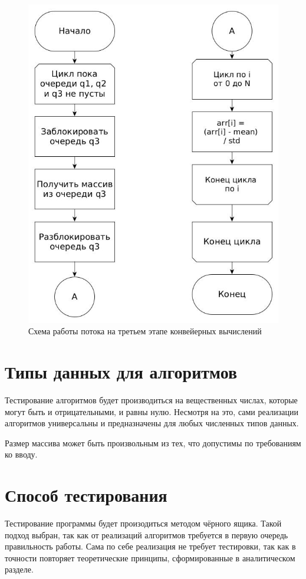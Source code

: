 \FloatBarrier
\begin{figure}[hp]
	\label{classic}
	\begin{center}
		\includegraphics[width=\linewidth]{graph/ex3.jpg}
	\end{center}
	\caption{Схема работы потока на третьем этапе конвейерных вычислений}
\end{figure}
\FloatBarrier


\section{Типы данных для алгоритмов}
Тестирование алгоритмов будет производиться на вещественных числах, 
которые могут быть и отрицательными, и равны нулю. Несмотря на это,
сами реализации алгоритмов универсальны и предназначены для любых численных типов данных.

Размер массива может быть произвольным из тех, что допустимы по требованиям ко вводу.

\section{Способ тестирования}
Тестирование программы будет произодиться методом чёрного ящика.
Такой подход выбран, так как от реализаций алгоритмов требуется в первую
очередь правильность работы.
Сама по себе реализация не требует тестировки, так как в точности
повторяет теоретические принципы, сформированные в аналитическом
разделе.

